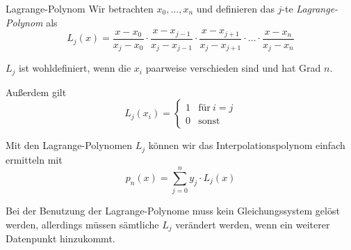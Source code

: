 \begin{defi}{Lagrange-Polynom}
    Wir betrachten $x_0, \ldots, x_n$ und definieren das $j$-te \emph{Lagrange-Polynom} als 
    \[ 
        L_j(x) = \frac{x - x_0}{x_j - x_0} \cdot \frac{x - x_{j-1}}{x_j - x_{j-1}} \cdot \frac{x - x_{j+1}}{x_j - x_{j+1}} \cdot \ldots \cdot \frac{x - x_n}{x_j - x_n}
    \]
    
    $L_j$ ist wohldefiniert, wenn die $x_i$ paarweise verschieden sind und hat Grad $n$.
    
    Außerdem gilt 
    \[
        L_j(x_i) = 
        \begin{cases}
            1 & \text{für} \ i = j \\ 
            0 & \text{sonst}
        \end{cases}
    \]
    
    Mit den Lagrange-Polynomen $L_j$ können wir das Interpolationspolynom einfach ermitteln mit 
    \[
        p_n(x) = \sum_{j = 0}^{n} y_j \cdot L_j(x)    
    \]
    
    Bei der Benutzung der Lagrange-Polynome muss kein Gleichungssystem gelöst werden, allerdings müssen sämtliche $L_j$ verändert werden, wenn ein weiterer Datenpunkt hinzukommt.
\end{defi}

